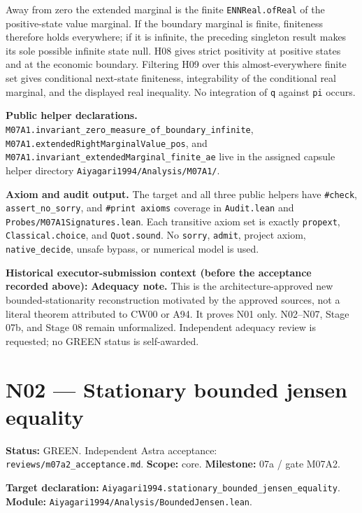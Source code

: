 \documentclass[
  11pt,
]{article}
\let\LedgerOriginalTexttt\texttt
\renewcommand{\texttt}[1]{{\small\LedgerOriginalTexttt{#1}}}
\begin{document}
Away from zero the extended marginal is the finite
\texttt{ENNReal.ofReal} of the positive-state value marginal. If the
boundary marginal is finite, finiteness therefore holds everywhere; if
it is infinite, the preceding singleton result makes its sole possible
infinite state null. H08 gives strict positivity at positive states and
at the economic boundary. Filtering H09 over this almost-everywhere
finite set gives conditional next-state finiteness, integrability of the
conditional real marginal, and the displayed real inequality. No
integration of \texttt{q} against \texttt{pi} occurs.

\textbf{Public helper declarations.}
\texttt{M07A1.invariant\_zero\_measure\_of\_boundary\_infinite},
\texttt{M07A1.extendedRightMarginalValue\_pos}, and
\texttt{M07A1.invariant\_extendedMarginal\_finite\_ae} live in the
assigned capsule helper directory \texttt{Aiyagari1994/Analysis/M07A1/}.

\textbf{Axiom and audit output.} The target and all three public helpers
have \texttt{\#check}, \texttt{assert\_no\_sorry}, and
\texttt{\#print\ axioms} coverage in \texttt{Audit.lean} and
\texttt{Probes/M07A1Signatures.lean}. Each transitive axiom set is
exactly \texttt{propext}, \texttt{Classical.choice}, and
\texttt{Quot.sound}. No \texttt{sorry}, \texttt{admit}, project axiom,
\texttt{native\_decide}, unsafe bypass, or numerical model is used.

\textbf{Historical executor-submission context (before the acceptance
recorded above):} \textbf{Adequacy note.} This is the
architecture-approved new bounded-stationarity reconstruction motivated
by the approved sources, not a literal theorem attributed to CW00 or
A94. It proves N01 only. N02--N07, Stage 07b, and Stage 08 remain
unformalized. Independent adequacy review is requested; no GREEN status
is self-awarded.

\section{N02 --- Stationary bounded jensen
equality}\label{n02-stationary-bounded-jensen-equality}

\textbf{Status:} GREEN. Independent Astra acceptance:
\texttt{reviews/m07a2\_acceptance.md}. \textbf{Scope:} core.
\textbf{Milestone:} 07a / gate M07A2.

\textbf{Target declaration:}
\texttt{Aiyagari1994.stationary\_bounded\_jensen\_equality}.\\
\textbf{Module:} \texttt{Aiyagari1994/Analysis/BoundedJensen.lean}.
\end{document}

